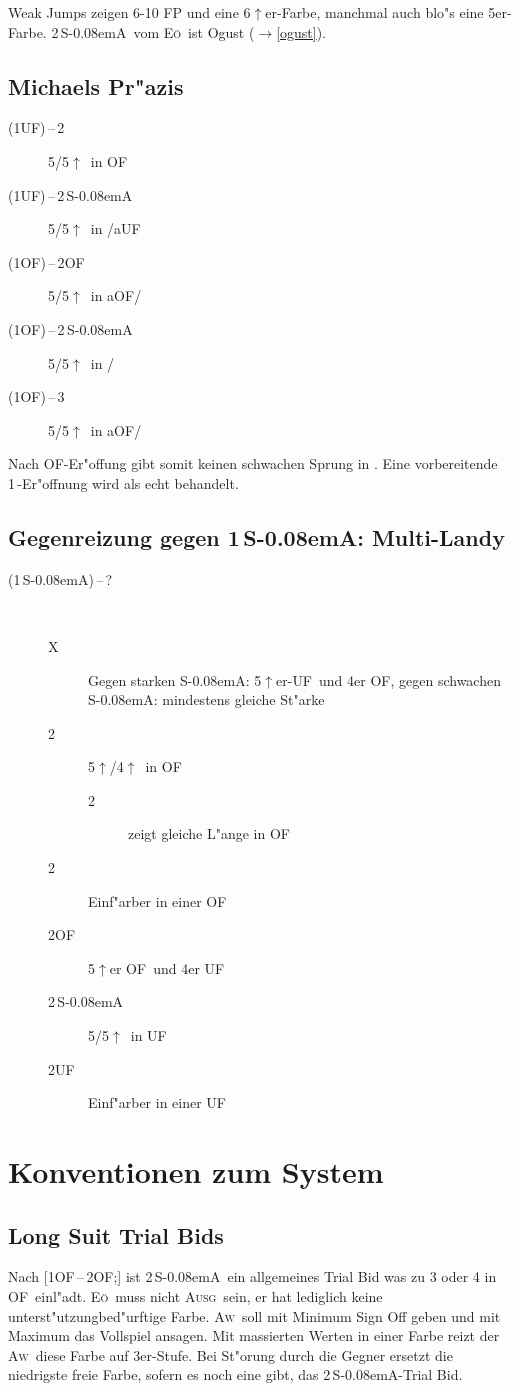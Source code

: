 \documentclass[11pt,german,twocolumn]{scrartcl}
\renewcommand{\Cl}{{\color{ClColor}{\clubs}}}
\renewcommand{\Di}{{\color{DiColor}{\sdiamonds}}}
\renewcommand{\He}{{\color{HeColor}{\shearts}}}
\def\kar{\,\Di}
\def\tre{\,\Cl}
\def\co{\He}
\def\ka{\Di}
\def\tr{\Cl}
\def\ra{$\rightarrow$}
\def\pl{$\uparrow$}
\def\ufa{\textsf{UF}}
\def\aufa{\textsf{aUF}}
\def\ofa{\textsf{OF}}
\def\aofa{\textsf{aOF}}
\def\sa{\textsf{S\kern-0.08emA}}
\def\SA{\,\sa}
\def\kontra{\textsf{X}}
\def\sep{\,--\,}
\def\bal{\textsc{Ausg}}
\def\aw{\textsc{Aw}}
\def\eo{\textsc{E\"o}}
\def\bdsc{\begin{description}}
\def\edsc{\end{description}}
\begin{document}
Weak Jumps zeigen 6-10 FP und eine 6\pl{}er-Farbe, manchmal auch blo"s eine
5er-Farbe. 2\SA\ vom \eo\ ist Ogust (\ra \ref{ogust}).

\subsection{Michaels Pr"azis}

\bdsc
\item[(1\ufa)\sep2\ka] 5/5\pl\ in \ofa
\item[(1\ufa)\sep2\SA] 5/5\pl\ in \co/\aufa
\item[(1\ofa)\sep2\ofa] 5/5\pl\ in \aofa/\tr
\item[(1\ofa)\sep2\SA] 5/5\pl\ in \tr/\ka
\item[(1\ofa)\sep3\tre] 5/5\pl\ in \aofa/\ka
\edsc

Nach \ofa-Er"offung gibt somit keinen schwachen Sprung in \tr. Eine
vorbereitende 1\tre-Er"offnung wird als echt behandelt.

\subsection{Gegenreizung gegen 1\SA: Multi-Landy}

\bdsc
\item[(1\SA)\sep?] ~
 \bdsc
 \item[\kontra] Gegen starken \sa: 5\pl{}er-\ufa\ und 4er \ofa,
  gegen schwachen \sa: mindestens gleiche St"arke
 \item[2\tre] 5\pl/4\pl\ in \ofa
  \bdsc
  \item[2\kar] zeigt gleiche L"ange in \ofa
  \edsc
 \item[2\kar] Einf"arber in einer \ofa
 \item[2\ofa] 5\pl{}er \ofa\ und 4er \ufa
 \item[2\SA] 5/5\pl\ in \ufa
 \item[2\ufa] Einf"arber in einer \ufa
 \edsc
\edsc

\section{Konventionen zum System}

\subsection{Long Suit Trial Bids}

Nach [1\ofa\sep2\ofa;] ist 2\SA\ ein allgemeines Trial Bid was zu 3 oder 4 in
\ofa\ einl"adt. \eo\ muss nicht \bal\ sein, er hat lediglich keine
unterst"utzungbed"urftige Farbe. \aw\ soll mit Minimum Sign Off geben und mit
Maximum das Vollspiel ansagen. Mit massierten Werten in einer Farbe reizt der
\aw\ diese Farbe auf 3er-Stufe. Bei St"orung durch die Gegner ersetzt die
niedrigste freie Farbe, sofern es noch eine gibt, das 2\SA-Trial Bid.
\end{document}
